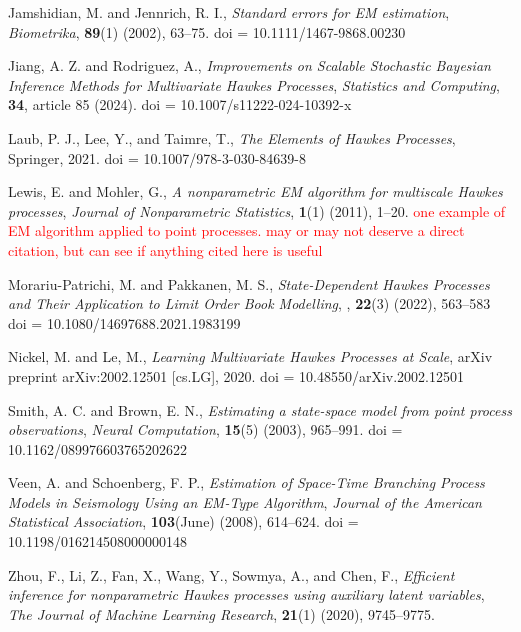 \documentclass[honours,12pt]{unswthesis}
\numberwithin{equation}{section}
\begin{document}
\begin{thebibliography}{999}
Jamshidian, M. and Jennrich, R. I.,
\textit{Standard errors for EM estimation},
\textit{Biometrika},
\textbf{89}(1) (2002), 63--75.
doi = {10.1111/1467-9868.00230}

Jiang, A. Z. and Rodriguez, A.,
\textit{Improvements on Scalable Stochastic Bayesian Inference Methods for Multivariate Hawkes Processes},
\textit{Statistics and Computing},
\textbf{34}, article 85 (2024).
doi = {10.1007/s11222-024-10392-x}

Laub, P. J., Lee, Y., and Taimre, T.,
\textit{The Elements of Hawkes Processes},
Springer, 2021.
doi = {10.1007/978-3-030-84639-8}

Lewis, E. and Mohler, G.,
\textit{A nonparametric EM algorithm for multiscale Hawkes processes},
\textit{Journal of Nonparametric Statistics},
\textbf{1}(1) (2011), 1--20.
\textcolor{red}{one example of EM algorithm applied to point processes.  may or may not deserve a direct citation, but can see if anything cited here is useful}

Morariu-Patrichi, M. and Pakkanen, M. S.,
\textit{State-Dependent Hawkes Processes and Their Application to Limit Order Book Modelling},
,
\textbf{22}(3) (2022), 563--583
doi = {10.1080/14697688.2021.1983199}

Nickel, M. and Le, M.,
\textit{Learning Multivariate Hawkes Processes at Scale},
arXiv preprint arXiv:2002.12501 [cs.LG], 2020.
doi = {10.48550/arXiv.2002.12501}

Smith, A. C. and Brown, E. N.,
\textit{Estimating a state-space model from point process observations},
\textit{Neural Computation},
\textbf{15}(5) (2003), 965--991.
doi = {10.1162/089976603765202622}

Veen, A. and Schoenberg, F. P.,
\textit{Estimation of Space-Time Branching Process Models in Seismology Using an EM-Type Algorithm},
\textit{Journal of the American Statistical Association},
\textbf{103}(June) (2008), 614--624.
doi = {10.1198/016214508000000148}

Zhou, F., Li, Z., Fan, X., Wang, Y., Sowmya, A., and Chen, F.,
\textit{Efficient inference for nonparametric Hawkes processes using auxiliary latent variables},
\textit{The Journal of Machine Learning Research},
\textbf{21}(1) (2020), 9745--9775.





\end{thebibliography}
\end{document}
